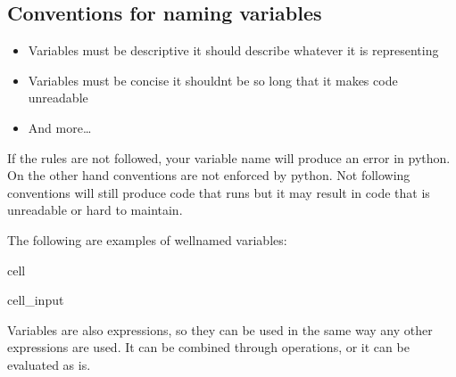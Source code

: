 \documentclass[letterpaper,10pt,english]{jupyterBook}
\begin{document}
\subsection{Conventions for naming variables}
\label{\detokenize{expressions:conventions-for-naming-variables}}\begin{itemize}
\item {} 
\sphinxAtStartPar
Variables must be descriptive \sphinxhyphen{} it should describe whatever it is representing

\item {} 
\sphinxAtStartPar
Variables must be concise \sphinxhyphen{} it shouldnt be so long that it makes code unreadable

\item {} 
\sphinxAtStartPar
And more…

\end{itemize}

\sphinxAtStartPar
If the rules are not followed, your variable name will produce an error in python. On the other hand conventions are not enforced by python. Not following conventions will still produce code that runs but it may result in code that is unreadable or hard to maintain.

\sphinxAtStartPar
The following are examples of well\sphinxhyphen{}named variables:

\begin{sphinxuseclass}{cell}\begin{sphinxVerbatimInput}

\begin{sphinxuseclass}{cell_input}
\begin{sphinxVerbatim}[commandchars=\\\{\}]
  
  
  
\end{sphinxVerbatim}

\end{sphinxuseclass}\end{sphinxVerbatimInput}

\end{sphinxuseclass}
\sphinxAtStartPar
Variables are also expressions, so they can be used in the same way any other expressions are used. It can be combined through operations, or it can be evaluated as is.
\end{document}
